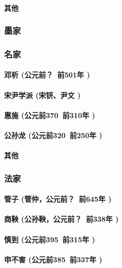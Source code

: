 \documentclass[UTF8]{../RepresentationUniverse}
\begin{document}
        \paragraph{其他}

    \subsubsection{墨家}
    \subsubsection{名家}
        \paragraph{邓析 (公元前？~前501年 )}
        \paragraph{宋尹学派 (宋钘、尹文 )}
        \paragraph{惠施 (公元前370~前310年 )}
        \paragraph{公孙龙 (公元前320~前250年 )}
        \paragraph{其他}

    \subsubsection{法家}
        \paragraph{管子 (管仲，公元前？~前645年 )}
        \paragraph{商鞅 (公孙鞅，公元前？~前338年 )}
        \paragraph{慎到 (公元前395~前315年 )}
        \paragraph{申不害 (公元前385~前337年 )}
\end{document}
